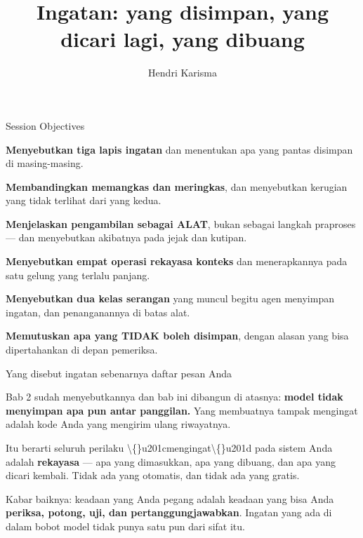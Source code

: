 \documentclass[aspectratio=169,11pt,t]{beamer}
\title{Ingatan: yang disimpan, yang dicari lagi, yang dibuang}
\author{Hendri Karisma}
\date{}
\begin{document}
\covertitle

\begin{frame}[shrink=25]{Session Objectives}
\begin{isteps}
\item \textbf{Menyebutkan tiga lapis ingatan} dan menentukan apa yang pantas disimpan di masing-masing.
\item \textbf{Membandingkan memangkas dan meringkas}, dan menyebutkan kerugian yang tidak terlihat dari yang kedua.
\item \textbf{Menjelaskan pengambilan sebagai ALAT}, bukan sebagai langkah praproses --- dan menyebutkan akibatnya pada jejak dan kutipan.
\item \textbf{Menyebutkan empat operasi rekayasa konteks} dan menerapkannya pada satu gelung yang terlalu panjang.
\item \textbf{Menyebutkan dua kelas serangan} yang muncul begitu agen menyimpan ingatan, dan penanganannya di batas alat.
\item \textbf{Memutuskan apa yang TIDAK boleh disimpan}, dengan alasan yang bisa dipertahankan di depan pemeriksa.
\end{isteps}

\vskip 6pt
\vskip 4pt
\vskip 2pt
\end{frame}


\begin{frame}[shrink=25]{Yang disebut ingatan sebenarnya daftar pesan Anda}
{\fontsize{9.4}{12.6}\selectfont\color{fg2}Bab 2 sudah menyebutkannya dan bab ini dibangun di atasnya: \textbf{model tidak menyimpan apa pun antar panggilan.} Yang membuatnya tampak mengingat adalah kode Anda yang mengirim ulang riwayatnya.\par}\vskip 4pt
{\fontsize{9.4}{12.6}\selectfont\color{fg2}Itu berarti seluruh perilaku \textbackslash\{\}u201cmengingat\textbackslash\{\}u201d pada sistem Anda adalah \textbf{rekayasa} --- apa yang dimasukkan, apa yang dibuang, dan apa yang dicari kembali. Tidak ada yang otomatis, dan tidak ada yang gratis.\par}\vskip 4pt
\begin{iband}[signal]
Kabar baiknya: keadaan yang Anda pegang adalah keadaan yang bisa Anda \textbf{periksa, potong, uji, dan pertanggungjawabkan}. Ingatan yang ada di dalam bobot model tidak punya satu pun dari sifat itu.
\end{iband}
\end{frame}
\end{document}
